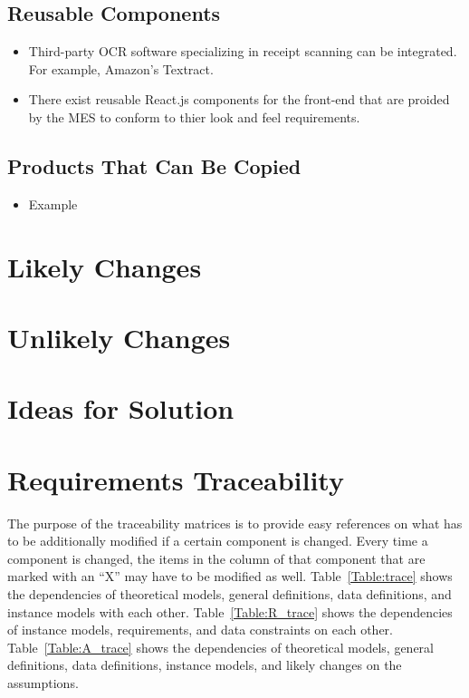 \documentclass[12pt]{article}
\begin{document}
  \subsection{Reusable Components}
    \begin{itemize}
      \item Third-party OCR software specializing in receipt scanning can be integrated. For example, Amazon's Textract.
      \item There exist reusable React.js components for the front-end that are proided by the MES to conform to thier look and feel requirements.
    \end{itemize}

  \subsection{Products That Can Be Copied}
    \begin{itemize}
      \item Example
    \end{itemize}

\section{Likely Changes}    

\section{Unlikely Changes}    

\section{Ideas for Solution}

\section{Requirements Traceability}

The purpose of the traceability matrices is to provide easy references on what
has to be additionally modified if a certain component is changed.  Every time a
component is changed, the items in the column of that component that are marked
with an ``X'' may have to be modified as well.  Table~\ref{Table:trace} shows the
dependencies of theoretical models, general definitions, data definitions, and
instance models with each other. Table~\ref{Table:R_trace} shows the
dependencies of instance models, requirements, and data constraints on each
other. Table~\ref{Table:A_trace} shows the dependencies of theoretical models,
general definitions, data definitions, instance models, and likely changes on
the assumptions.
\end{document}
